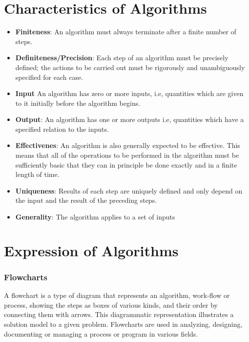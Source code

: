 \documentclass[12pt,a4paper]{book}
\begin{document}
\section{Characteristics of Algorithms}
\begin{itemize}
\item \textbf{Finiteness}: An algorithm must always terminate after a finite number of steps.
\item \textbf{Definiteness/Precision}: Each step of an algorithm must be precisely defined; the actions to be carried out must be rigorously and unambiguously specified for each case.
\item \textbf{Input} An algorithm has zero or more inputs, i.e, quantities which are given to it initially before the algorithm begins.
\item \textbf{Output}: An algorithm has one or more outputs i.e, quantities which have a specified relation to the inputs.
\item \textbf{Effectivenes}: An algorithm is also generally expected to be effective. This means that all of the operations to be performed in the algorithm must be sufficiently basic that they can in principle be done exactly and in a finite length of time.
\item \textbf{Uniqueness}: 	Results of each step are uniquely defined and only depend on the input and the result of the preceding steps.
\item \textbf{Generality}:	The algorithm applies to a set of inputs
\end{itemize}

\section{Expression of Algorithms}
\subsubsection{Flowcharts}
A flowchart is a type of diagram that represents an algorithm, work-flow or process, showing the steps as boxes of various kinds, and their order by connecting them with arrows. This diagrammatic representation illustrates a solution model to a given problem. Flowcharts are used in analyzing, designing, documenting or managing a process or program in various fields.
\end{document}
